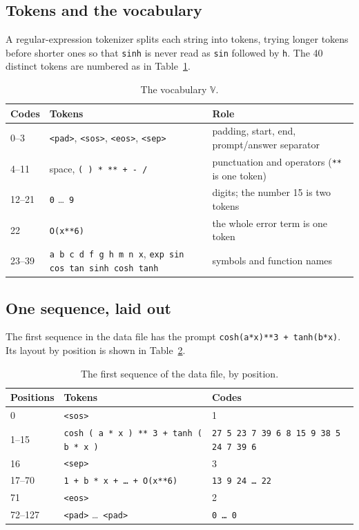 \documentclass[11pt]{article}
\newcommand{\tok}[1]{\texttt{<#1>}}
\newcommand{\code}[1]{\texttt{#1}}
\newcommand{\V}{\mathbb{V}}
\begin{document}
\subsection{Tokens and the vocabulary}

A regular-expression tokenizer splits each string into tokens, trying longer tokens
before shorter ones so that \code{sinh} is never read as \code{sin} followed by
\code{h}. The 40 distinct tokens are numbered as in Table~\ref{tab:vocab}.

\begin{table}[h]
\centering\small
\caption{The vocabulary $\V$.}
\label{tab:vocab}
\begin{tabularx}{\linewidth}{@{}lXX@{}}
\toprule
Codes & Tokens & Role \\
\midrule
0--3 & \tok{pad}, \tok{sos}, \tok{eos}, \tok{sep} & padding, start, end, prompt/answer separator \\
4--11 & space, \code{( ) * ** + - /} & punctuation and operators (\code{**} is one token) \\
12--21 & \code{0} \dots\ \code{9} & digits; the number 15 is two tokens \\
22 & \code{O(x**6)} & the whole error term is one token \\
23--39 & \code{a b c d f g h m n x}, \code{exp sin cos tan sinh cosh tanh} & symbols and function names \\
\bottomrule
\end{tabularx}
\end{table}

\subsection{One sequence, laid out}

The first sequence in the data file has the prompt \code{cosh(a*x)**3 + tanh(b*x)}.
Its layout by position is shown in Table~\ref{tab:layout}.

\begin{table}[h]
\centering\small
\caption{The first sequence of the data file, by position.}
\label{tab:layout}
\begin{tabular}{@{}lll@{}}
\toprule
Positions & Tokens & Codes \\
\midrule
0 & \tok{sos} & 1 \\
1--15 & \code{cosh ( a * x ) ** 3 + tanh ( b * x )} & \code{27 5 23 7 39 6 8 15 9 38 5 24 7 39 6} \\
16 & \tok{sep} & 3 \\
17--70 & \code{1 + b * x + \dots\ + O(x**6)} & \code{13 9 24 \dots\ 22} \\
71 & \tok{eos} & 2 \\
72--127 & \tok{pad} \dots\ \tok{pad} & \code{0 \dots\ 0} \\
\bottomrule
\end{tabular}
\end{table}
\end{document}
